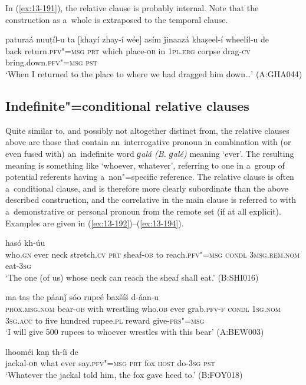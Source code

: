 In (\ref{ex:13-191}), the relative clause is probably internal. Note that the construction as a~whole is extraposed to the temporal clause.

\begin{exe}
\ex
\label{ex:13-191}
\gll paturaá nuuṭíl-u ta [khayí zhay-í wée] asím  ǰinaazá khaṣeel-í wheelíl-u de \\
back return.\textsc{pfv"=msg} \textsc{prt} which place-\textsc{ob} in \textsc{1pl.erg} corpse drag-\textsc{cv}  bring.down.\textsc{pfv"=msg} \textsc{pst}   \\
\glt `When I returned to the place to where we had dragged him down{\ldots}' (A:GHA044)
\end{exe}

\subsection{Indefinite"=conditional relative clauses}
\label{subsec:13-6-2}

Quite similar to, and possibly not altogether distinct from, the relative clauses above are those that contain an~interrogative pronoun in combination with (or even fused with) an~indefinite word \textit{ɡalá} \textit{(B. ɡalé)} meaning `ever'. The resulting meaning is something like `whoever, whatever', referring to one in a~group of potential referents having a~non"=specific reference. The relative clause is often a~conditional clause, and is therefore more clearly subordinate than the above described construction, and the correlative in the main clause is referred to with a~demonstrative or personal pronoun from the remote set (if at all explicit). Examples are given in (\ref{ex:13-192})--(\ref{ex:13-194}).

\begin{exe}
\ex
\label{ex:13-192}
 hasó kh-úu \\
who.\textsc{gn} ever neck stretch.\textsc{cv} \textsc{prt} sheaf-\textsc{ob} to  reach.\textsc{pfv"=msg} \textsc{condl} \textsc{3msg.rem.nom} eat-\textsc{3sg} \\
\glt `The one (of us) whose neck can reach the sheaf shall eat.' (B:SHI016)

\ex
\label{ex:13-193}
 ma tas
the páanǰ sóo rupeé baxšíš  d-áan-u \\
\textsc{prox.msg.nom}{\protect\footnotemark} bear-\textsc{ob} with wrestling who.\textsc{ob} ever grab.\textsc{pfv-f} \textsc{condl} \textsc{1sg.nom} \textsc{3sg.acc} to five hundred rupee.\textsc{pl} reward give-\textsc{prs"=msg} \\
\glt `I will give 500 rupees to whoever wrestles with this bear' (A:BEW003)

\ex
\label{ex:13-194}
 lhooméi kaṇ  th-íi de \\
jackal-\textsc{ob} what ever say.\textsc{pfv"=msg} \textsc{prt} fox \textsc{host} do-\textsc{3sg} \textsc{pst} \\
\glt `Whatever the jackal told him, the fox gave heed to.' (B:FOY018) 
\end{exe}

